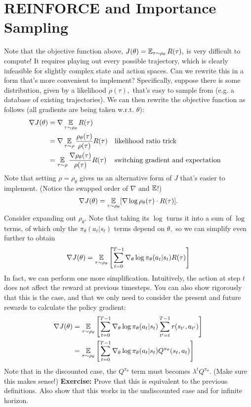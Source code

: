 \documentclass[../main/main]{subfiles}
\begin{document}
\section{REINFORCE and Importance Sampling}

Note that the objective function above, $J(\theta) = \operatorname*{\mathbb{E}}_{\tau \sim \rho_\theta}R(\tau),$ is very difficult to compute! It requires playing out every possible trajectory,
which is clearly infeasible for slightly complex state and action spaces.
Can we rewrite this in a form that's more convenient to implement?
Specifically, suppose there is some distribution, given by a likelihood $\rho(\tau),$ that's easy to sample from (e.g. a database of existing trajectories).
We can then rewrite the objective function as follows (all gradients are being taken w.r.t. $\theta$):
\begin{align*}
    \nabla J(\theta) &= \nabla \operatorname*{\mathbb{E}}_{\tau \sim \rho_\theta} R(\tau) \\
    &= \nabla \operatorname*{\mathbb{E}}_{\tau \sim \rho} \frac{\rho_\theta(\tau)}{\rho(\tau)} R(\tau) && \text{likelihood ratio trick} \\
    &= \operatorname*{\mathbb{E}}_{\tau \sim \rho} \frac{\nabla \rho_\theta(\tau)}{\rho(\tau)} R(\tau) && \text{switching gradient and expectation}
\end{align*}
Note that setting $\rho = \rho_\theta$ gives us an alternative form of $J$ that's easier to implement. (Notice the swapped order of $\nabla$ and $\operatorname*{\mathbb{E}}$!)
\begin{align*}
    \nabla J(\theta) = \operatorname*{\mathbb{E}}_{\tau \sim \rho_\theta} [ \nabla \log \rho_\theta(\tau) \cdot R(\tau)].
\end{align*}
Consider expanding out $\rho_\theta.$ Note that taking its $\log$ turns it into a sum of $\log$ terms, of which only the $\pi_\theta(a_t | s_t)$ terms depend on $\theta,$ so we can simplify even further to obtain
\begin{align*}
    \nabla J(\theta) = \operatorname*{\mathbb{E}}_{\tau \sim \rho_\theta} \left[ \sum_{t=0}^{T-1} \nabla_\theta \log \pi_{\theta}(a_t | s_t) R(\tau) \right]
\end{align*}
In fact, we can perform one more simplification. Intuitively, the action at step $t$ does not affect the reward at previous timesteps. You can also show rigorously that this is the case, and that we only need to consider the present and future rewards to calculate the policy gradient: \begin{equation}
    \begin{split}
    \nabla J(\theta) &= \operatorname*{\mathbb{E}}_{\tau \sim \rho_\theta} \left[ \sum_{t=0}^{T-1} \nabla_\theta \log \pi_{\theta}(a_t | s_t) \sum_{t' = t}^{T-1} r(s_{t'}, a_{t'}) \right] \\
    &= \operatorname*{\mathbb{E}}_{\tau \sim \rho_\theta} \left[ \sum_{t=0}^{T-1} \nabla_\theta \log \pi_{\theta}(a_t | s_t) Q^{\pi_\theta}(s_{t}, a_{t}) \right]
    \end{split}
    \label{eq:pg_with_q}
\end{equation}
Note that in the discounted case, the $Q^{\pi_\theta}$ term must becomes $\lambda^t Q^{\pi_\theta}.$ (Make sure this makes sense!)
\textbf{Exercise:} Prove that this is equivalent to the previous definitions. Also show that this works in the undiscounted case and for infinite horizon.
\end{document}
